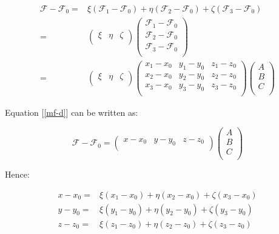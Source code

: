 \documentclass[10pt]{article}
\begin{document}
\begin{equation}\label{tfti}
\begin{align}
\mathcal{F}-\mathcal{F}_0=&\xi(\mathcal{F}_1-\mathcal{F}_0)+\eta(\mathcal{F}_2-\mathcal{F}_0)%
+\zeta(\mathcal{F}_3-\mathcal{F}_0)\\
=&\begin{pmatrix}
  \xi & \eta & \zeta \\
\end{pmatrix}
\begin{pmatrix}
  \mathcal{F}_1-\mathcal{F}_0\\
  \mathcal{F}_2-\mathcal{F}_0\\
  \mathcal{F}_3-\mathcal{F}_0\\
\end{pmatrix}
\\ =&\begin{pmatrix}
  \xi & \eta & \zeta \\
\end{pmatrix}
\begin{pmatrix}
  x_1-x_0 & y_1-y_0 & z_1-z_0 \\
  x_2-x_0 & y_2-y_0 & z_2-z_0 \\
  x_3-x_0 & y_3-y_0 & z_3-z_0 \\
\end{pmatrix}\begin{pmatrix}
  A\\
  B\\
  C\\
\end{pmatrix}
\end{align}
\end{equation}

Equation [\ref{mf-d}] can be written as:

\begin{equation}\label{mf-dmat}
\mathcal{F}-\mathcal{F}_0=\begin{pmatrix}
  x-x_0 & y-y_0 & z-z_0 \\
\end{pmatrix}
\begin{pmatrix}
  A\\
  B\\
  C\\
\end{pmatrix}
\end{equation}

Hence:

\begin{equation}\label{parxyz}
\begin{align}
x-x_0=&\xi(x_1-x_0)+\eta(x_2-x_0)+\zeta(x_3-x_0)\\
y-y_0=&\xi(y_1-y_0)+\eta(y_2-y_0)+\zeta(y_3-y_0)\\
z-z_0=&\xi(z_1-z_0)+\eta(z_2-z_0)+\zeta(z_3-z_0)
\end{align}
\end{equation}
\end{document}
